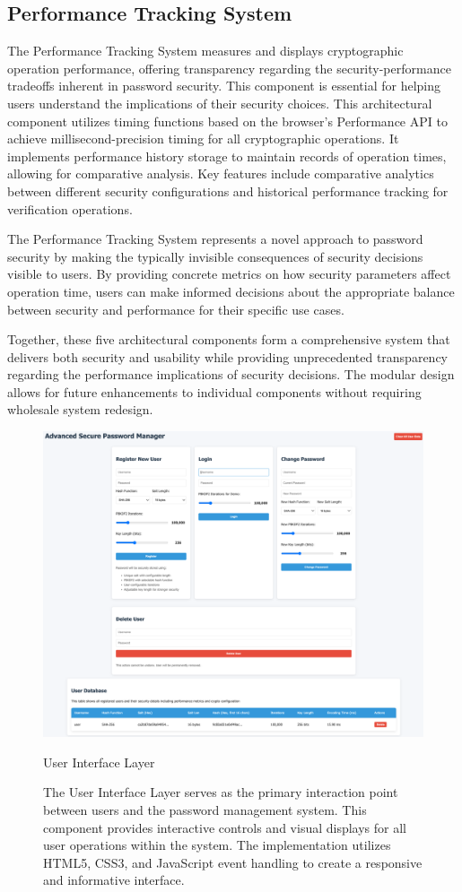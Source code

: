 \documentclass[11pt,a4paper]{article}
\begin{document}
\subsection{Performance Tracking System}
The Performance Tracking System measures and displays cryptographic operation performance, offering transparency regarding the security-performance tradeoffs inherent in password security. This component is essential for helping users understand the implications of their security choices.
This architectural component utilizes timing functions based on the browser's Performance API to achieve millisecond-precision timing for all cryptographic operations. It implements performance history storage to maintain records of operation times, allowing for comparative analysis. Key features include comparative analytics between different security configurations and historical performance tracking for verification operations.

The Performance Tracking System represents a novel approach to password security by making the typically invisible consequences of security decisions visible to users. By providing concrete metrics on how security parameters affect operation time, users can make informed decisions about the appropriate balance between security and performance for their specific use cases.

Together, these five architectural components form a comprehensive system that delivers both security and usability while providing unprecedented transparency regarding the performance implications of security decisions. The modular design allows for future enhancements to individual components without requiring wholesale system redesign.
\begin{figure}
\centering
\includegraphics[width=1\linewidth]{images/UI.png}
\caption{User Interface Layer}
\caption*{The User Interface Layer serves as the primary interaction point between users and the password management system. This component provides interactive controls and visual displays for all user operations within the system. The implementation utilizes HTML5, CSS3, and JavaScript event handling to create a responsive and informative interface.}
\label{UI}
\end{figure}
\end{document}
